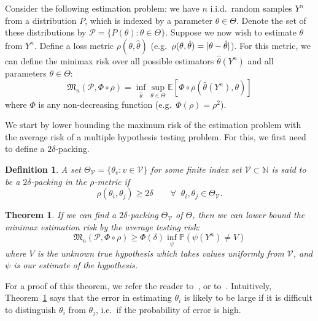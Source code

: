 \documentclass[conference,letterpaper]{IEEEtran}
\DeclarePairedDelimiter\abs{\lvert}{\rvert}
\newcommand{\Phiorho}{\Phi\!\circ\!\rho}
\newtheorem{theorem}{Theorem}
\newtheorem{definition}{Definition}
\begin{document}
Consider the following estimation problem: we have $n$ i.i.d.\ random samples
$Y^n$ from a distribution $P$, which is indexed by a parameter $\theta \in
\Theta$.  Denote the set of these distributions by $\mathcal{P} = \{P(\theta) :
\theta \in \Theta\}$. Suppose we now wish to estimate $\theta$ from $Y^n$.
Define a loss metric $\rho(\theta, \hat\theta)$ (e.g.\ $\rho(\theta,
\hat\theta) = \abs{\theta - \hat\theta}$). For this metric, we can define the
minimax risk over all possible estimators $\hat\theta(Y^n)$ and all parameters
$\theta \in \Theta$:
\begin{equation} \label{eq:minimax-expr}
	\mathfrak{M}_n(\mathcal{P}, \Phiorho) = \inf_{\hat\theta} \sup_{\theta \in \Theta} \mathbb E[\Phiorho (\hat\theta(Y^n), \theta)]
\end{equation}
where $\Phi$ is any non-decreasing function (e.g.\ $\Phi(\rho) = \rho^2$).

We start by lower bounding the maximum risk of the estimation problem with the
average risk of a multiple hypothesis testing problem. For this, we first need
to define a $2\delta$-packing.%
\begin{definition}
	A set $\Theta_{\mathcal{V}} = \{ \theta_v : v \in \mathcal{V} \}$ for some
	finite index set $\mathcal{V} \subset \mathbb N$ is said to be a
	$2\delta$-packing in the $\rho$-metric if
	\begin{equation}
		\rho(\theta_i, \theta_j) \geq 2\delta \qquad \forall \;\; \theta_i, \theta_j \in \Theta_{\mathcal{V}}.
	\end{equation}
\end{definition}
\begin{theorem} \label{thm:est-to-testing}%
	If we can find a $2\delta$-packing $\Theta_{\mathcal{V}}$ of $\Theta$, then
	we can lower bound the minimax estimation risk by the average testing risk:
	\begin{equation}
		\mathfrak{M}_n(\mathcal{P}, \Phiorho) \geq \Phi(\delta) \inf_\psi \mathbb P (\psi(Y^n) \neq V)
	\end{equation}
	where $V$ is the unknown true hypothesis which takes values uniformly from
	$\mathcal{V}$, and $\psi$ is our estimate of the hypothesis.
\end{theorem}
For a proof of this theorem, we refer the reader
to~\cite[Sec.~2.2]{Tsybakov2009Introduction}, or
to~\cite[Prop.~13.3]{Duchi2015Information}. Intuitively,
Theorem~\ref{thm:est-to-testing} says that the error in estimating $\theta_i$
is likely to be large if it is difficult to distinguish $\theta_i$ from
$\theta_j$, i.e.\ if the probability of error is high.
\end{document}
